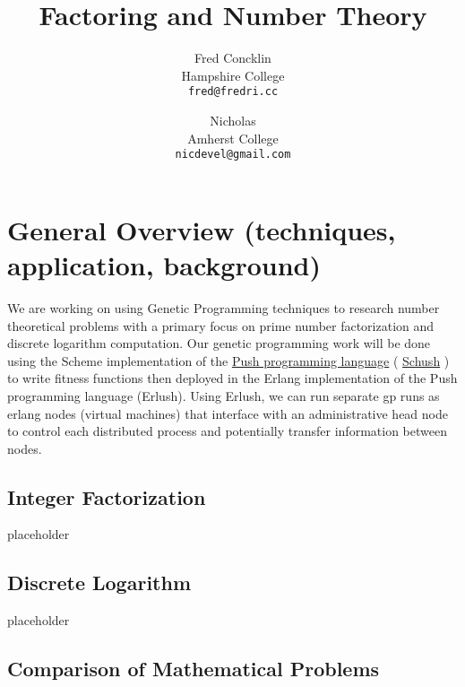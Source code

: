 \documentclass{article}
\begin{document}


\title{Factoring and Number Theory}
\author{Fred Concklin \\ Hampshire College \\ \texttt{fred@fredri.cc} \and Nicholas \\ Amherst College \\ \texttt{nicdevel@gmail.com}}

\maketitle

\tableofcontents

\pagebreak

\section[General Overview]{General Overview (techniques, application, background)}

We are working on using Genetic Programming techniques to research number theoretical problems with a primary focus on prime number factorization and discrete logarithm computation. Our genetic programming work will be done using the Scheme implementation of the \href{http://hampshire.edu/lspector/push.html}{Push programming language} ( \href{http://push.i3ci.hampshire.edu/2009/09/21/schush-updates/}{Schush} ) to write fitness functions then deployed in the Erlang implementation of the Push programming language (Erlush). Using Erlush, we can run separate gp runs as erlang nodes (virtual machines) that interface with an administrative head node to control each distributed process and potentially transfer information between nodes. 

\subsection{Integer Factorization}

placeholder

\subsection{Discrete Logarithm}

placeholder

\subsection{Comparison of Mathematical Problems}
\end{document}
